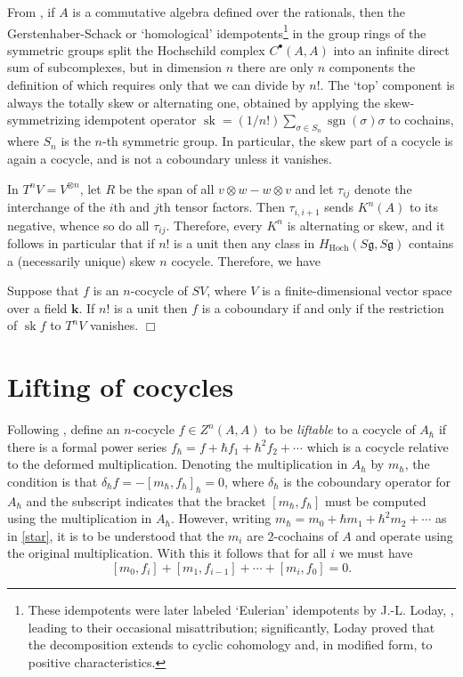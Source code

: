 \documentclass{amsart}
\begin{document}
From \cite{GS:Hodge}, if $A$ is a commutative algebra defined over the rationals, then the Gerstenhaber-Schack or `homological' idempotents\footnote{These idempotents were later labeled `Eulerian' idempotents by J.-L. Loday, \cite{Loday:Euler}, leading to their occasional misattribution; significantly, Loday proved that the decomposition extends to cyclic cohomology and, in modified form, to positive characteristics.} in the group rings of the symmetric groups split the Hochschild complex $C^{\bullet}(A,A)$ into an infinite direct sum of subcomplexes, but in dimension $n$ there are only $n$ components the definition of which requires only that we can divide by $n!$. The `top' component is always the totally skew or alternating one, obtained by applying
the skew-symmetrizing idempotent operator ${\operatorname{sk}} = (1/n!)\sum_{\sigma\in S_n} \operatorname{sgn}(\sigma)\sigma$ to cochains, where $S_n$ is the $n$-th symmetric group. In particular, the skew part of a cocycle is again a cocycle, and is not a coboundary unless it vanishes.

In $T^nV = V^{\otimes n}$, let $R$ be the span of all $v\otimes w -w\otimes v$ and let $\tau_{ij}$ denote the interchange of the $i$th and $j$th tensor factors.    Then $\tau_{i,i+1}$ sends $K^n(A)$ to its negative, whence so do all $\tau_{ij}$. Therefore, every $K^n$ is alternating or skew, and it follows in particular that if $n!$ is a unit then any class in ${\ensuremath{H_{\text{Hoch}}}}(S{\mathfrak{g}}, S{\mathfrak{g}})$ contains a (necessarily unique) skew $n$ cocycle.
Therefore, we have
\begin{lemma}\label{projection} 
Suppose that $f$ is an $n$-cocycle of $SV$, where $V$ is a finite-dimensional vector space over a field ${\ensuremath{\mathbf{k}}}$. If $n!$ is a unit then $f$ is a coboundary if and only if the restriction of  ${\operatorname{sk}} f$ to $T^nV$ vanishes. $\Box$
\end{lemma} 

\section{Lifting of cocycles}  
 Following \cite{G:Def4}, define an $n$-cocycle $f\in Z^n(A,A)$ to be \emph{liftable} to a cocycle of $A_{\hbar}$ if there is a formal power series 
 $f_{\hbar} = f + \hbar f_1 + \hbar^2 f_2 + \cdots$ which is a cocycle relative to the deformed multiplication.  Denoting the multiplication in $A_{\hbar}$ by  $m_{\hbar}$, the condition is that $\delta_{\hbar} f = -[m_{\hbar}, f_{\hbar}]_{\hbar} = 0$, where $\delta_{\hbar}$ is the coboundary operator for $A_{\hbar}$ and the subscript indicates that the bracket $[m_{\hbar}, f_{\hbar}]$ must be computed using the multiplication in $A_{\hbar}$. However,  writing $m_{\hbar} = m_0 + \hbar m_1 + \hbar^2m_2 + \cdots$ as in \eqref{star}, it is to be understood that the $m_i$ are 2-cochains of $A$  and operate using the original multiplication. With this it follows  
that for all $i$ we must have
 \begin{equation}\label{obstruction}
 [m_0, f_i] + [m_1,f_{i-1}] +\cdots+[m_i,f_0]  = 0.
 \end{equation}
\end{document}
